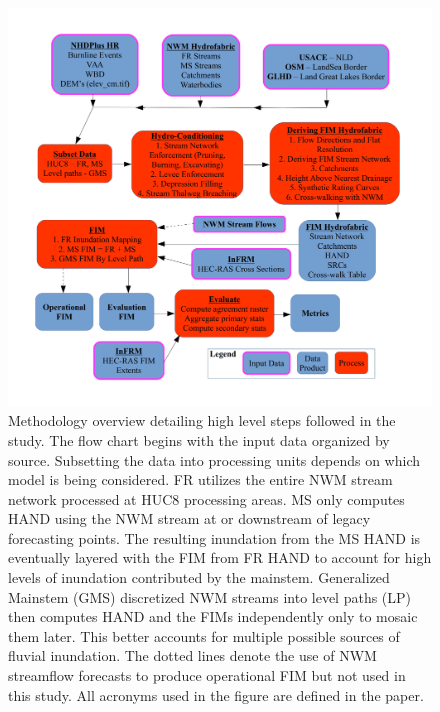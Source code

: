 \documentclass[draft]{dependencies/agujournal2019}
\begin{document}
\begin{figure}[H]
\centering
\includegraphics[scale=6.0]{figures/methods_overview.jpg}
\caption{
Methodology overview detailing high level steps followed in the study.
The flow chart begins with the input data organized by source.
Subsetting the data into processing units depends on which model is being considered.
FR utilizes the entire NWM stream network processed at HUC8 processing areas.
MS only computes HAND using the NWM stream at or downstream of legacy forecasting points.
The resulting inundation from the MS HAND is eventually layered with the FIM from FR HAND to account for high levels of inundation contributed by the mainstem.
Generalized Mainstem (GMS) discretized NWM streams into level paths (LP) then computes HAND and the FIMs independently only to mosaic them later. 
This better accounts for multiple possible sources of fluvial inundation.
The dotted lines denote the use of NWM streamflow forecasts to produce operational FIM but not used in this study.
All acronyms used in the figure are defined in the paper.
}
\label{fig:methods_overview}
\end{figure}
%
%
\end{document}
